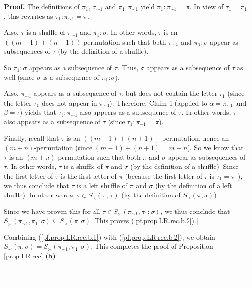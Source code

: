 \documentclass[numbers=enddot,12pt,final,onecolumn,notitlepage]{scrartcl}%
\theoremstyle{definition}
\newenvironment{proof}[1][Proof]{\noindent\textbf{#1.} }{\ \rule{0.5em}{0.5em}}
\begin{document}
\begin{proof}
The definitions of $\pi_{1}$, $\pi_{\sim1}$ and $\pi_{1}:\pi_{\sim1}$ yield
$\pi_{1}:\pi_{\sim1}=\pi$. In view of $\tau_{1}=\pi_{1}$, this rewrites as
$\tau_{1}:\pi_{\sim1}=\pi$.

Also, $\tau$ is a shuffle of $\pi_{\sim1}$ and $\pi_{1}:\sigma$. In other
words, $\tau$ is an $\left(  \left(  m-1\right)  +\left(  n+1\right)  \right)
$-permutation such that both $\pi_{\sim1}$ and $\pi_{1}:\sigma$ appear as
subsequences of $\tau$ (by the definition of a shuffle).

So $\pi_{1}:\sigma$ appears as a subsequence of $\tau$. Thus, $\sigma$ appears
as a subsequence of $\tau$ as well (since $\sigma$ is a subsequence of
$\pi_{1}:\sigma$).

Also, $\pi_{\sim1}$ appears as a subsequence of $\tau$, but does not contain
the letter $\tau_{1}$ (since the letter $\tau_{1}$ does not appear in
$\pi_{\sim1}$). Therefore, Claim 1 (applied to $\alpha=\pi_{\sim1}$ and
$\beta=\tau$) yields that $\tau_{1}:\pi_{\sim1}$ also appears as a subsequence
of $\tau$. In other words, $\pi$ also appears as a subsequence of $\tau$
(since $\tau_{1}:\pi_{\sim1}=\pi$).

Finally, recall that $\tau$ is an $\left(  \left(  m-1\right)  +\left(
n+1\right)  \right)  $-permutation, hence an $\left(  m+n\right)
$-permutation (since $\left(  m-1\right)  +\left(  n+1\right)  =m+n$). So we
know that $\tau$ is an $\left(  m+n\right)  $-permutation such that both $\pi$
and $\sigma$ appear as subsequences of $\tau$. In other words, $\tau$ is a
shuffle of $\pi$ and $\sigma$ (by the definition of a shuffle). Since the
first letter of $\tau$ is the first letter of $\pi$ (because the first letter
of $\tau$ is $\tau_{1}=\pi_{1}$), we thus conclude that $\tau$ is a left
shuffle of $\pi$ and $\sigma$ (by the definition of a left shuffle). In other
words, $\tau\in S_{\prec}\left(  \pi,\sigma\right)  $ (by the definition of
$S_{\prec}\left(  \pi,\sigma\right)  $).

Since we have proven this for all $\tau\in S_{\succ}\left(  \pi_{\sim1}%
,\pi_{1}:\sigma\right)  $, we thus conclude that $S_{\succ}\left(  \pi_{\sim
1},\pi_{1}:\sigma\right)  \subseteq S_{\prec}\left(  \pi,\sigma\right)  $.
This proves (\ref{pf.prop.LR.rec.b.2}).]

Combining (\ref{pf.prop.LR.rec.b.1}) with (\ref{pf.prop.LR.rec.b.2}), we
obtain $S_{\prec}\left(  \pi,\sigma\right)  =S_{\succ}\left(  \pi_{\sim1}%
,\pi_{1}:\sigma\right)  $. This completes the proof of Proposition
\ref{prop.LR.rec} \textbf{(b)}.


\end{proof}
\end{document}
